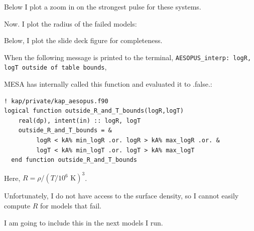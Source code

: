 \documentclass[a4paper,10pt]{article}
\begin{document}
\nextpage

Below I plot a zoom in on the strongest pulse for these systems.

\begin{figure}[ht]
    \centering
\end{figure}

Now. I plot the radius of the failed models:
\begin{figure}[ht]
    \centering
\end{figure}

Below, I plot the slide deck figure for completeness.
\begin{figure}[ht]
    \centering
\end{figure}




When the following message is printed to the terminal,
\texttt{AESOPUS_interp: logR, logT outside of table bounds},

MESA has internally called this function and evaluated it to .false.:
\begin{verbatim}
! kap/private/kap_aesopus.f90
logical function outside_R_and_T_bounds(logR,logT)
    real(dp), intent(in) :: logR, logT
    outside_R_and_T_bounds = &
         logR < kA% min_logR .or. logR > kA% max_logR .or. &
         logT < kA% min_logT .or. logT > kA% max_logT
  end function outside_R_and_T_bounds
\end{verbatim}
Here, \(R = \rho /(T/10^{6} \text{ K})^{3}\).

Unfortunately, I do not have access to the surface density, so I cannot easily compute \(R\) for models that fail.

I am going to include this in the next models I run.





\end{document}
